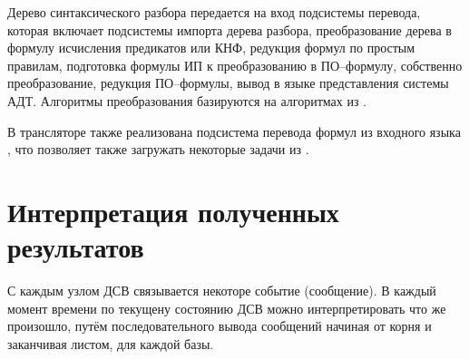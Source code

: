 Дерево синтаксического разбора передается на вход подсистемы перевода, которая включает подсистемы импорта дерева разбора, преобразование дерева в формулу исчисления предикатов или КНФ, редукция формул по простым правилам, подготовка формулы ИП к преобразованию в ПО--формулу, собственно преобразование, редукция ПО--формулы, вывод в языке представления системы АДТ. Алгоритмы преобразования базируются на алгоритмах из \cite{dissChe}. %

В трансляторе также реализована подсистема перевода формул из входного языка \cite{dissChe}, что позволяет также загружать некоторые задачи из \cite{dissChe}.

\section{Интерпретация полученных результатов}
С каждым узлом ДСВ связывается некоторе событие (сообщение). В каждый момент времени по текущену состоянию ДСВ можно интерпретировать что же произошло, путём последовательного вывода сообщений начиная от корня и заканчивая листом, для каждой базы.





